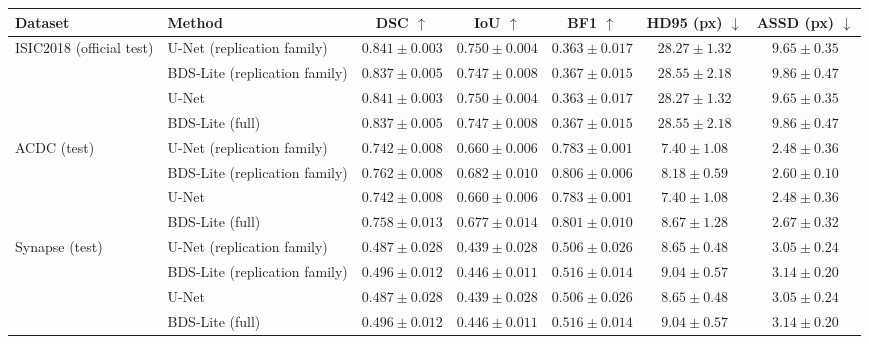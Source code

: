 \begin{tabular}{llccccc}
\toprule
Dataset & Method & DSC $\uparrow$ & IoU $\uparrow$ & BF1 $\uparrow$ & HD95 (px) $\downarrow$ & ASSD (px) $\downarrow$ \\
\midrule
ISIC2018 (official test) & U-Net (replication family) & $0.841 \pm 0.003$ & $0.750 \pm 0.004$ & $0.363 \pm 0.017$ & $28.27 \pm 1.32$ & $9.65 \pm 0.35$ \\
 & BDS-Lite (replication family) & $0.837 \pm 0.005$ & $0.747 \pm 0.008$ & $0.367 \pm 0.015$ & $28.55 \pm 2.18$ & $9.86 \pm 0.47$ \\
 & U-Net & $0.841 \pm 0.003$ & $0.750 \pm 0.004$ & $0.363 \pm 0.017$ & $28.27 \pm 1.32$ & $9.65 \pm 0.35$ \\
 & BDS-Lite (full) & $0.837 \pm 0.005$ & $0.747 \pm 0.008$ & $0.367 \pm 0.015$ & $28.55 \pm 2.18$ & $9.86 \pm 0.47$ \\
\midrule
ACDC (test) & U-Net (replication family) & $0.742 \pm 0.008$ & $0.660 \pm 0.006$ & $0.783 \pm 0.001$ & $7.40 \pm 1.08$ & $2.48 \pm 0.36$ \\
 & BDS-Lite (replication family) & $0.762 \pm 0.008$ & $0.682 \pm 0.010$ & $0.806 \pm 0.006$ & $8.18 \pm 0.59$ & $2.60 \pm 0.10$ \\
 & U-Net & $0.742 \pm 0.008$ & $0.660 \pm 0.006$ & $0.783 \pm 0.001$ & $7.40 \pm 1.08$ & $2.48 \pm 0.36$ \\
 & BDS-Lite (full) & $0.758 \pm 0.013$ & $0.677 \pm 0.014$ & $0.801 \pm 0.010$ & $8.67 \pm 1.28$ & $2.67 \pm 0.32$ \\
\midrule
Synapse (test) & U-Net (replication family) & $0.487 \pm 0.028$ & $0.439 \pm 0.028$ & $0.506 \pm 0.026$ & $8.65 \pm 0.48$ & $3.05 \pm 0.24$ \\
 & BDS-Lite (replication family) & $0.496 \pm 0.012$ & $0.446 \pm 0.011$ & $0.516 \pm 0.014$ & $9.04 \pm 0.57$ & $3.14 \pm 0.20$ \\
 & U-Net & $0.487 \pm 0.028$ & $0.439 \pm 0.028$ & $0.506 \pm 0.026$ & $8.65 \pm 0.48$ & $3.05 \pm 0.24$ \\
 & BDS-Lite (full) & $0.496 \pm 0.012$ & $0.446 \pm 0.011$ & $0.516 \pm 0.014$ & $9.04 \pm 0.57$ & $3.14 \pm 0.20$ \\
\bottomrule
\end{tabular}
